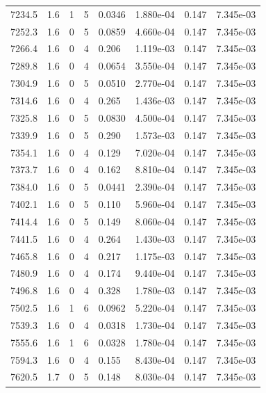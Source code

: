 \documentclass[preview]{standalone}
\begin{document}
{{{{{{{{{{{{{{\begin{tabular}{L{1.2cm}C{1.2cm} C{0.3cm}C{0.5cm} C{1.4cm}C{1.4cm} C{1.4cm}C{1.4cm}}
  7234.5  &   1.6  & 1     &  5 &  0.0346  & 1.880e-04  & 0.147 &  7.345e-03   \\ 
  7252.3  &   1.6  & 0     &  5 &  0.0859  & 4.660e-04  & 0.147 &  7.345e-03   \\ 
  7266.4  &   1.6  & 0     &  4 &  0.206  & 1.119e-03  & 0.147 &  7.345e-03   \\ 
  7289.8  &   1.6  & 0     &  4 &  0.0654  & 3.550e-04  & 0.147 &  7.345e-03   \\ 
  7304.9  &   1.6  & 0     &  5 &  0.0510  & 2.770e-04  & 0.147 &  7.345e-03   \\ 
  7314.6  &   1.6  & 0     &  4 &  0.265  & 1.436e-03  & 0.147 &  7.345e-03   \\ 
  7325.8  &   1.6  & 0     &  5 &  0.0830  & 4.500e-04  & 0.147 &  7.345e-03   \\ 
  7339.9  &   1.6  & 0     &  5 &  0.290  & 1.573e-03  & 0.147 &  7.345e-03   \\ 
  7354.1  &   1.6  & 0     &  4 &  0.129  & 7.020e-04  & 0.147 &  7.345e-03   \\ 
  7373.7  &   1.6  & 0     &  4 &  0.162  & 8.810e-04  & 0.147 &  7.345e-03   \\ 
  7384.0  &   1.6  & 0     &  5 &  0.0441  & 2.390e-04  & 0.147 &  7.345e-03   \\ 
  7402.1  &   1.6  & 0     &  5 &  0.110  & 5.960e-04  & 0.147 &  7.345e-03   \\ 
  7414.4  &   1.6  & 0     &  5 &  0.149  & 8.060e-04  & 0.147 &  7.345e-03   \\ 
  7441.5  &   1.6  & 0     &  4 &  0.264  & 1.430e-03  & 0.147 &  7.345e-03   \\ 
  7465.8  &   1.6  & 0     &  4 &  0.217  & 1.175e-03  & 0.147 &  7.345e-03   \\ 
  7480.9  &   1.6  & 0     &  4 &  0.174  & 9.440e-04  & 0.147 &  7.345e-03   \\ 
  7496.8  &   1.6  & 0     &  4 &  0.328  & 1.780e-03  & 0.147 &  7.345e-03   \\ 
  7502.5  &   1.6  & 1     &  6 &  0.0962  & 5.220e-04  & 0.147 &  7.345e-03   \\ 
  7539.3  &   1.6  & 0     &  4 &  0.0318  & 1.730e-04  & 0.147 &  7.345e-03   \\ 
  7555.6  &   1.6  & 1     &  6 &  0.0328  & 1.780e-04  & 0.147 &  7.345e-03   \\ 
  7594.3  &   1.6  & 0     &  4 &  0.155  & 8.430e-04  & 0.147 &  7.345e-03   \\ 
  7620.5  &   1.7  & 0     &  5 &  0.148  & 8.030e-04  & 0.147 &  7.345e-03   \\ 

\end{tabular}}}}}}}}}}}}}}}
\end{document}
